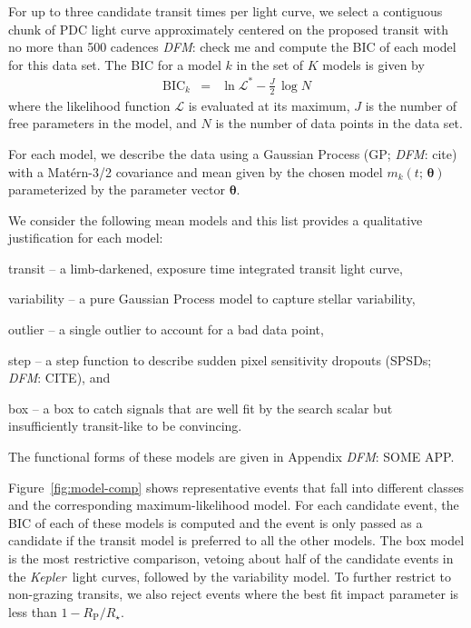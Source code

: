 \documentclass[manuscript, letterpaper]{aastex6}
\newcommand{\project}[1]{\textsl{#1}}
\newcommand{\kepler}{\project{Kepler}}
\newcommand{\dfmfigref}[1]{\ref{fig:#1}}
\newcommand{\dfmFig}[1]{Figure~\dfmfigref{#1}}
\newcommand{\dfmfig}[1]{\dfmFig{#1}}
\newcommand{\bvec}[1]{{\ensuremath{\boldsymbol{#1}}}}
\newcommand{\todo}[3]{{\color{#2}\emph{#1}: #3}}
\newcommand{\dfmtodo}[1]{\todo{DFM}{red}{#1}}
\newcommand{\meanpars}{{\ensuremath{\bvec{\theta}}}}
\newcommand{\modelname}[1]{{\textsf{#1}}}
\begin{document}
For up to three candidate transit times per light curve, we select a
contiguous chunk of PDC light curve approximately centered on the proposed
transit with no more than 500 cadences \dfmtodo{check me} and compute the BIC
of each model for this data set.
The BIC for a model $k$ in the set of $K$ models is given by
\begin{eqnarray}
\mathrm{BIC}_k &=& \ln \mathcal{L}^* - \frac{J}{2}\,\log N
\end{eqnarray}
where the likelihood function $\mathcal{L}$ is evaluated at its maximum, $J$
is the number of free parameters in the model, and $N$ is the number of
data points in the data set.

For each model, we describe the data using a Gaussian Process (GP;
\dfmtodo{cite}) with a Mat\'ern-3/2 covariance and mean given by the chosen
model $m_k(t;\,\meanpars)$ parameterized by the parameter vector \meanpars.

We consider the following mean models and this list provides a qualitative
justification for each model:
\begin{itemize}
{\item \modelname{transit} -- a limb-darkened, exposure time integrated
transit light curve,}
{\item \modelname{variability} -- a pure Gaussian Process model to capture
stellar variability,}
{\item \modelname{outlier} -- a single outlier to account for a bad data
point,}
{\item \modelname{step} -- a step function to describe sudden pixel
sensitivity dropouts (SPSDs; \dfmtodo{CITE}), and}
{\item \modelname{box} -- a box to catch signals that are well fit by the
search scalar but insufficiently transit-like to be convincing.}
\end{itemize}
The functional forms of these models are given in Appendix \dfmtodo{SOME APP}.

\dfmfig{model-comp} shows representative events that fall into different
classes and the corresponding maximum-likelihood model.
For each candidate event, the BIC of each of these models is computed and the
event is only passed as a candidate if the \modelname{transit} model is
preferred to all the other models.
The \modelname{box} model is the most restrictive comparison, vetoing about
half of the candidate events in the \kepler\ light curves, followed by the
\modelname{variability} model.
To further restrict to non-grazing transits, we also reject events where the
best fit impact parameter is less than $1 - R_\mathrm{P} / R_\star$.
\end{document}
